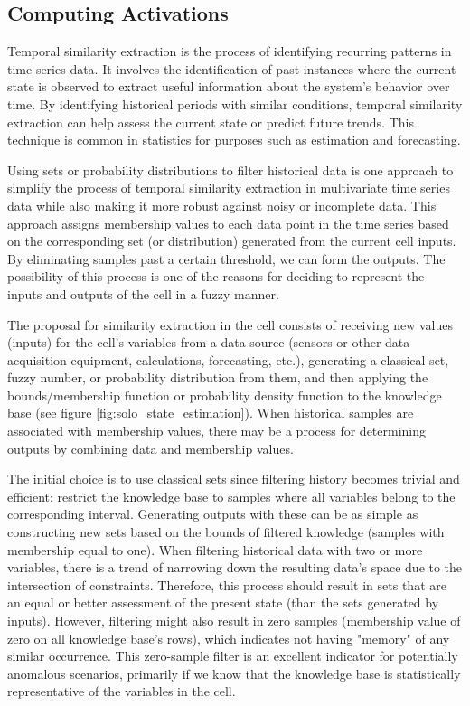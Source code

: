 \subsection{Computing Activations} \label{subsec:tempsim}

Temporal similarity extraction is the process of identifying recurring patterns in time series data. It involves the identification of past instances where the current state is observed to extract useful information about the system's behavior over time. By identifying historical periods with similar conditions, temporal similarity extraction can help assess the current state or predict future trends. This technique is common in statistics for purposes such as estimation and forecasting.

Using sets or probability distributions to filter historical data is one approach to simplify the process of temporal similarity extraction in multivariate time series data while also making it more robust against noisy or incomplete data. This approach assigns membership values to each data point in the time series based on the corresponding set (or distribution) generated from the current cell inputs. By eliminating samples past a certain threshold, we can form the outputs. The possibility of this process is one of the reasons for deciding to represent the inputs and outputs of the cell in a fuzzy manner. 

The proposal for similarity extraction in the cell consists of receiving new values (inputs) for the cell's variables from a data source (sensors or other data acquisition equipment, calculations, forecasting, etc.), generating a classical set, fuzzy number, or probability distribution from them, and then applying the bounds/membership function or probability density function to the knowledge base (see figure \ref{fig:solo_state_estimation}). When historical samples are associated with membership values, there may be a process for determining outputs by combining data and membership values.

The initial choice is to use classical sets since filtering history becomes trivial and efficient: restrict the knowledge base to samples where all variables belong to the corresponding interval. Generating outputs with these can be as simple as constructing new sets based on the bounds of filtered knowledge (samples with membership equal to one). When filtering historical data with two or more variables, there is a trend of narrowing down the resulting data's space due to the intersection of constraints. Therefore, this process should result in sets that are an equal or better assessment of the present state (than the sets generated by inputs). However, filtering might also result in zero samples (membership value of zero on all knowledge base's rows), which indicates not having "memory" of any similar occurrence. This zero-sample filter is an excellent indicator for potentially anomalous scenarios, primarily if we know that the knowledge base is statistically representative of the variables in the cell.


